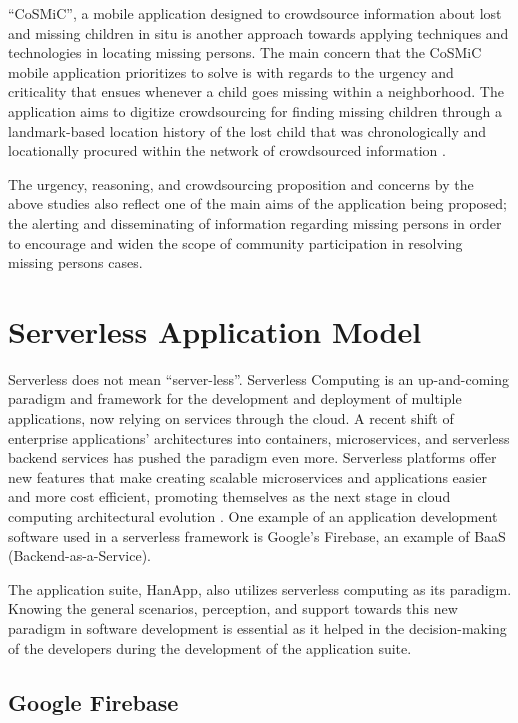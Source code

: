 “CoSMiC”, a mobile application designed to crowdsource information about lost and missing children in situ is another approach towards applying techniques and technologies in locating missing persons. The main concern that the CoSMiC mobile application prioritizes to solve is with regards to the urgency and criticality that ensues whenever a child goes missing within a neighborhood. The application aims to digitize crowdsourcing for finding missing children through a landmark-based location history of the lost child that was chronologically and locationally procured within the network of crowdsourced information \cite{shin2014cosmic}.

The urgency, reasoning, and crowdsourcing proposition and concerns by the above studies also reflect one of the main aims of the application being proposed; the alerting and disseminating of information regarding missing persons in order to encourage and widen the scope of community participation in resolving missing persons cases.

\section{Serverless Application Model}

Serverless does not mean “server-less”. Serverless Computing is an up-and-coming paradigm and framework for the development and deployment of multiple applications, now relying on services through the cloud. A recent shift of enterprise applications’ architectures into containers, microservices, and serverless backend services has pushed the paradigm even more. Serverless platforms offer new features that make creating scalable microservices and applications easier and more cost efficient, promoting themselves as the next stage in cloud computing architectural evolution \cite{castro2017serverless}. One example of an application development software used in a serverless framework is Google’s Firebase, an example of BaaS (Backend-as-a-Service).

The application suite, HanApp, also utilizes serverless computing as its paradigm. Knowing the general scenarios, perception, and support towards this new paradigm in software development is essential as it helped in the decision-making of the developers during the development of the application suite.

\subsection{Google Firebase}

